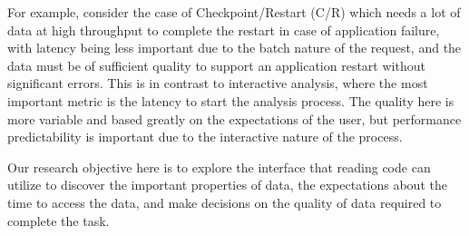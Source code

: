 For example, consider the case of Checkpoint/Restart (C/R) which needs a lot
of data at high throughput to complete the restart in case of application
failure, with latency being less important due to the batch nature of the
request, and the data must be of sufficient quality to support an
application restart without significant errors. 
This is in contrast to interactive analysis, where the most important metric
is the latency to start the analysis process. The quality here is more
variable and based greatly on the expectations of the user, but performance
predictability is important due to the interactive nature of the process. 

Our research objective here is to explore the interface that reading code
can utilize to discover the important properties of data, the expectations
about the time to access the data, and make decisions on the quality of data
required to complete the task. 

